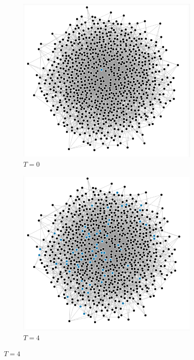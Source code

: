 \documentclass[10pt,journal,a4paper]{IEEEtran}
\begin{document}
\begin{figure}
\centering

\begin{subfigure}[b]{.5\linewidth}
\includegraphics[width=1\linewidth]{figs/barabasi-albert-0}
\caption{$T=0$}
\end{subfigure}%
\begin{subfigure}[b]{.5\linewidth}
\includegraphics[width=1\linewidth]{figs/barabasi-albert-4}
\caption{$T=4$}
\end{subfigure}


\end{figure}
\end{document}
